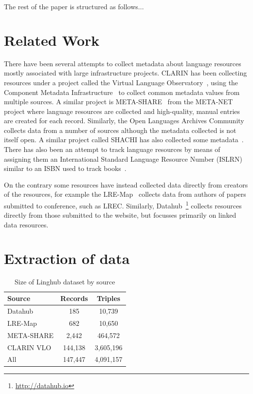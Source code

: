 \documentclass[11pt]{article}
\begin{document}
The rest of the paper is structured as follows...

\section{Related Work}

There have been several attempts to collect metadata about language resources
mostly associated with large infrastructure projects. CLARIN has been collecting
resources under a project called the Virtual Language
Observatory~\cite{van2012semantic}, using the Component
Metadata Infrastructure~\cite[CMDI]{broeder2012cmdi} to collect common metadata
values from multiple sources. A similar project is
META-SHARE~\cite{piperidis2012meta} from the META-NET project where language
resources are collected and high-quality, manual entries are created for each
record. Similarly, the Open Languages Archives
Community~\cite[OLAC]{bird2003extending} collects data from a number of sources
although the metadata collected is not itself open. A similar project called
SHACHI has also collected some metadata~\cite{tohyama2008shachi}. There has also
been an attempt to track language resources by means of assigning them an
International Standard Language Resource Number (ISLRN) similar to an ISBN used
to track books~\cite{choukri2012using}.

On the contrary some resources have instead collected data directly from
creators of the resources, for example the LRE-Map~\cite{calzolari2012lre} collects data from
authors of papers submitted to conference, such as LREC. Similarly,
Datahub~\footnote{\url{http://datahub.io}} collects resources directly from
those submitted to the website, but focusses primarily on linked data resources.

\section{Extraction of data}

\begin{table}
	\centering
	\begin{tabular}{p{30mm}|cc}
	Source               & Records    & Triples  \\
	\hline
	Datahub              & 185        & 10,739   \\
	LRE-Map              & 682        & 10,650   \\
	META-SHARE           & 2,442      & 464,572  \\
	CLARIN VLO           & 144,138    & 3,605,196\\
	\hline
	All                  & 147,447    & 4,091,157\\
	\end{tabular}
	\caption{Size of Linghub dataset by source\label{tab:size}}
\end{table}
\end{document}
